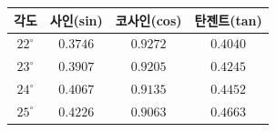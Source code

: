 {\renewcommand{\arraystretch}{1.25}\small
\begin{tabular}{|c|c|c|c|}
\hline
각도 & 사인(sin) & 코사인(cos) & 탄젠트(tan) \\ \hline
$22^\circ$ & $0.3746$ & $0.9272$ & $0.4040$ \\ \hline
$23^\circ$ & $0.3907$ & $0.9205$ & $0.4245$ \\ \hline
$24^\circ$ & $0.4067$ & $0.9135$ & $0.4452$ \\ \hline
$25^\circ$ & $0.4226$ & $0.9063$ & $0.4663$ \\ \hline
\end{tabular}}
